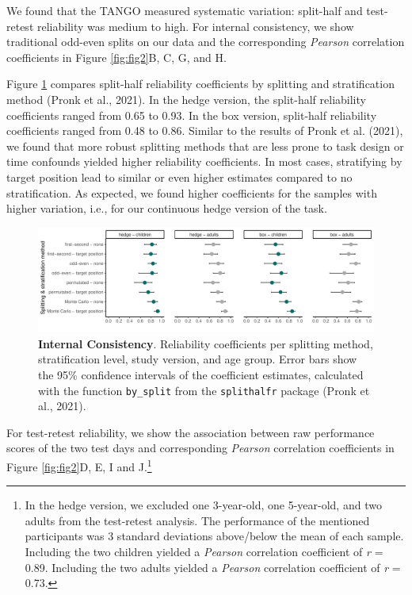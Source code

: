 \documentclass[
  man,floatsintext]{apa6}
\begin{document}
We found that the TANGO measured systematic variation: split-half and test-retest reliability was medium to high.
For internal consistency, we show traditional odd-even splits on our data and the corresponding \emph{Pearson} correlation coefficients in Figure \ref{fig:fig2}B, C, G, and H.

Figure \ref{fig:fig3} compares split-half reliability coefficients by splitting and stratification method (Pronk et al., 2021).
In the hedge version, the split-half reliability coefficients ranged from 0.65 to 0.93.
In the box version, split-half reliability coefficients ranged from 0.48 to 0.86.
Similar to the results of Pronk et al. (2021), we found that more robust splitting methods that are less prone to task design or time confounds yielded higher reliability coefficients.
In most cases, stratifying by target position lead to similar or even higher estimates compared to no stratification.
As expected, we found higher coefficients for the samples with higher variation, i.e., for our continuous hedge version of the task.



\begin{figure}

{\centering \includegraphics[width=1\linewidth]{../figures/tango_splithalf} 

}

\caption{\textbf{Internal Consistency}. Reliability coefficients per splitting method, stratification level, study version, and age group. Error bars show the 95\% confidence intervals of the coefficient estimates, calculated with the function \texttt{by\_split} from the \texttt{splithalfr} package (Pronk et al., 2021).}\label{fig:fig3}
\end{figure}

For test-retest reliability, we show the association between raw performance scores of the two test days and corresponding \emph{Pearson} correlation coefficients in Figure \ref{fig:fig2}D, E, I and J.\footnote{In the hedge version, we excluded one 3-year-old, one 5-year-old, and two adults from the test-retest analysis.
  The performance of the mentioned participants was 3 standard deviations above/below the mean of each sample.
  Including the two children yielded a \emph{Pearson} correlation coefficient of \emph{r} = 0.89.
  Including the two adults yielded a \emph{Pearson} correlation coefficient of \emph{r} = 0.73.}
\end{document}
